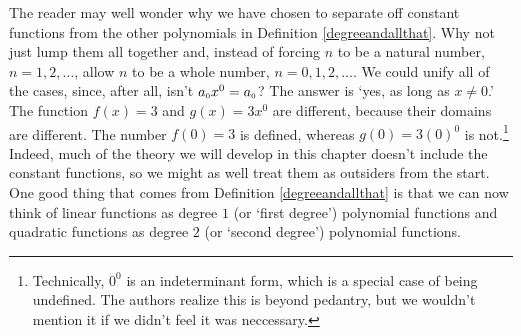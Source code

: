 The reader may well wonder why we have chosen to separate off constant functions from the other polynomials in Definition \ref{degreeandallthat}.  Why not just lump them all together and, instead of forcing $n$ to be a natural number, $n = 1, 2, \ldots$, allow $n$ to be a whole number, $n = 0, 1, 2, \ldots$.  We could unify all of the cases, since, after all, isn't $a_{\mbox{\tiny $0$}}x^{0} = a_{\mbox{\tiny $0$}}$?  The answer is `yes, as long as $x\neq 0$.'  The function $f(x) = 3$ and $g(x) = 3x^{0}$ are different, because their domains are different.  The number $f(0) = 3$ is defined, whereas $g(0) = 3(0)^{0}$ is not.\footnote{Technically, $0^{0}$ is an indeterminant form, which is a special case of being undefined.  The authors realize this is beyond pedantry, but we wouldn't mention it if we didn't feel it was neccessary.}   \label{indeterminantformone} Indeed, much of the theory we will develop in this chapter doesn't include the constant functions, so we might as well treat them as outsiders from the start.  One good thing that comes from Definition \ref{degreeandallthat} is that we can now think of linear functions as degree $1$ (or `first degree') polynomial functions and quadratic functions as degree $2$ (or `second degree') polynomial functions.

